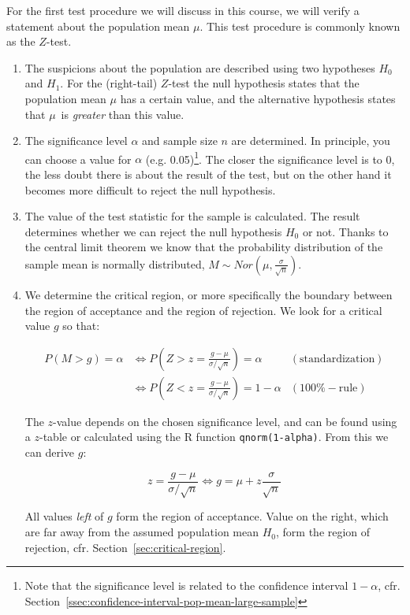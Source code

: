 For the first test procedure we will discuss in this course, we will verify a statement about the population mean $\mu$.
This test procedure is commonly known as the $Z$-test.

\begin{enumerate}
  \item The suspicions about the population are described using two hypotheses $H_{0}$ and $H_{1}$. For the (right-tail) $Z$-test the null hypothesis states that the population mean $\mu$ has a certain value, and the alternative hypothesis states that $\mu$\ is \emph{greater} than this value.
  \item The significance level $\alpha$ and sample size $n$ are determined. In principle, you can choose a value for $\alpha$ (e.g. 0.05)\footnote{Note that the significance level is related to the confidence interval $1-\alpha$, cfr. Section~\ref{ssec:confidence-interval-pop-mean-large-sample}}. The closer the significance level is to 0, the less doubt there is about the result of the test, but on the other hand it becomes more difficult to reject the null hypothesis.
  \item The value of the test statistic for the sample is calculated. The result determines whether we can reject the null hypothesis $H_{0}$ or not. Thanks to the central limit theorem we know that the probability distribution of the sample mean is normally distributed, $M \sim Nor( \mu, \frac{\sigma}{\sqrt{n}})$.
  \item We determine the critical region, or more specifically the boundary between the region of acceptance and the region of rejection. We look for a critical value $g$ so that:
  
  \begin{align}
  P(M > g) = \alpha & \Leftrightarrow P\left(Z> z=\frac{g-\mu}{\sigma/\sqrt{n}}\right) = \alpha & \mathrm{(standardization)}\\
  & \Leftrightarrow P\left(Z < z = \frac{g-\mu}{\sigma/\sqrt{n}}\right) = 1-\alpha & \mathrm{(100\%-rule)}
  \end{align}
  
  The $z$-value depends on the chosen significance level, and can be found using a $z$-table or calculated using the R function \texttt{qnorm(1-alpha)}. From this we can derive $g$:
  
  \begin{equation}
  z = \frac{g-\mu}{\sigma/\sqrt{n}} \Leftrightarrow g = \mu + z \frac{\sigma}{\sqrt{n}}
  \label{eq:critical-calue-z-test}
  \end{equation}

  All values \emph{left} of $g$ form the region of acceptance. Value on the right, which are far away from the assumed population mean $H_0$, form the region of rejection, cfr. Section~\ref{sec:critical-region}.
\end{enumerate}

